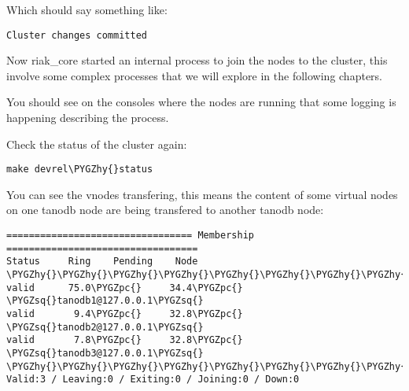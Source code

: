 \documentclass[letterpaper,10pt,english]{sphinxmanual}
\def\PYGZpc{\char`\%}
\def\PYGZhy{\char`\-}
\def\PYGZsq{\char`\'}
\renewcommand\PYGZsq{\textquotesingle}
\begin{document}
Which should say something like:

\begin{Verbatim}[commandchars=\\\{\}]
Cluster changes committed
\end{Verbatim}

Now riak\_core started an internal process to join the nodes to the cluster,
this involve some complex processes that we will explore in the following
chapters.

You should see on the consoles where the nodes are running that some logging
is happening describing the process.

Check the status of the cluster again:

\begin{Verbatim}[commandchars=\\\{\}]
make devrel\PYGZhy{}status
\end{Verbatim}

You can see the vnodes transfering, this means the content of some virtual
nodes on one tanodb node are being transfered to another tanodb node:

\begin{Verbatim}[commandchars=\\\{\}]
================================= Membership ==================================
Status     Ring    Pending    Node
\PYGZhy{}\PYGZhy{}\PYGZhy{}\PYGZhy{}\PYGZhy{}\PYGZhy{}\PYGZhy{}\PYGZhy{}\PYGZhy{}\PYGZhy{}\PYGZhy{}\PYGZhy{}\PYGZhy{}\PYGZhy{}\PYGZhy{}\PYGZhy{}\PYGZhy{}\PYGZhy{}\PYGZhy{}\PYGZhy{}\PYGZhy{}\PYGZhy{}\PYGZhy{}\PYGZhy{}\PYGZhy{}\PYGZhy{}\PYGZhy{}\PYGZhy{}\PYGZhy{}\PYGZhy{}\PYGZhy{}\PYGZhy{}\PYGZhy{}\PYGZhy{}\PYGZhy{}\PYGZhy{}\PYGZhy{}\PYGZhy{}\PYGZhy{}\PYGZhy{}\PYGZhy{}\PYGZhy{}\PYGZhy{}\PYGZhy{}\PYGZhy{}\PYGZhy{}\PYGZhy{}\PYGZhy{}\PYGZhy{}\PYGZhy{}\PYGZhy{}\PYGZhy{}\PYGZhy{}\PYGZhy{}\PYGZhy{}\PYGZhy{}\PYGZhy{}\PYGZhy{}\PYGZhy{}\PYGZhy{}\PYGZhy{}\PYGZhy{}\PYGZhy{}\PYGZhy{}\PYGZhy{}\PYGZhy{}\PYGZhy{}\PYGZhy{}\PYGZhy{}\PYGZhy{}\PYGZhy{}\PYGZhy{}\PYGZhy{}\PYGZhy{}\PYGZhy{}\PYGZhy{}\PYGZhy{}\PYGZhy{}\PYGZhy{}
valid      75.0\PYGZpc{}     34.4\PYGZpc{}    \PYGZsq{}tanodb1@127.0.0.1\PYGZsq{}
valid       9.4\PYGZpc{}     32.8\PYGZpc{}    \PYGZsq{}tanodb2@127.0.0.1\PYGZsq{}
valid       7.8\PYGZpc{}     32.8\PYGZpc{}    \PYGZsq{}tanodb3@127.0.0.1\PYGZsq{}
\PYGZhy{}\PYGZhy{}\PYGZhy{}\PYGZhy{}\PYGZhy{}\PYGZhy{}\PYGZhy{}\PYGZhy{}\PYGZhy{}\PYGZhy{}\PYGZhy{}\PYGZhy{}\PYGZhy{}\PYGZhy{}\PYGZhy{}\PYGZhy{}\PYGZhy{}\PYGZhy{}\PYGZhy{}\PYGZhy{}\PYGZhy{}\PYGZhy{}\PYGZhy{}\PYGZhy{}\PYGZhy{}\PYGZhy{}\PYGZhy{}\PYGZhy{}\PYGZhy{}\PYGZhy{}\PYGZhy{}\PYGZhy{}\PYGZhy{}\PYGZhy{}\PYGZhy{}\PYGZhy{}\PYGZhy{}\PYGZhy{}\PYGZhy{}\PYGZhy{}\PYGZhy{}\PYGZhy{}\PYGZhy{}\PYGZhy{}\PYGZhy{}\PYGZhy{}\PYGZhy{}\PYGZhy{}\PYGZhy{}\PYGZhy{}\PYGZhy{}\PYGZhy{}\PYGZhy{}\PYGZhy{}\PYGZhy{}\PYGZhy{}\PYGZhy{}\PYGZhy{}\PYGZhy{}\PYGZhy{}\PYGZhy{}\PYGZhy{}\PYGZhy{}\PYGZhy{}\PYGZhy{}\PYGZhy{}\PYGZhy{}\PYGZhy{}\PYGZhy{}\PYGZhy{}\PYGZhy{}\PYGZhy{}\PYGZhy{}\PYGZhy{}\PYGZhy{}\PYGZhy{}\PYGZhy{}\PYGZhy{}\PYGZhy{}
Valid:3 / Leaving:0 / Exiting:0 / Joining:0 / Down:0
\end{Verbatim}
\end{document}
